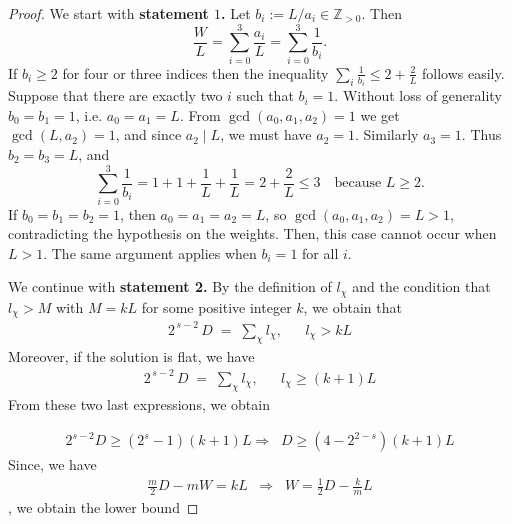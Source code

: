 \documentclass[12pt,twoside,]{amsart}
\theoremstyle{plain}
\theoremstyle{definition}
\begin{document}
\begin{proof}
We start with \textbf{statement $1$.} Let  $b_i:=L/a_i \in\mathbb{Z}_{>0}$. Then
\[
\frac{W}{L}=\sum_{i=0}^3\frac{a_i}{L}=\sum_{i=0}^3\frac{1}{b_i}.
\]
 If $b_i \geq 2$ for four or three indices then the inequality $\sum_i \frac{1}{b_i}\le 2+\frac{2}{L}$ follows easily. Suppose that there are exactly two $i$ such that $b_i =1$.  Without loss of generality $b_0=b_1=1$, i.e. $a_0=a_1=L$.
From $\gcd(a_0,a_1,a_2)=1$ we get $\gcd(L,a_2)=1$, and since $a_2\mid L$, we must have $a_2=1$. Similarly $a_3=1$. Thus $b_2=b_3=L$, and
\[
\sum_{i=0}^3 \frac{1}{b_i}=1+1+\frac{1}{L}+\frac{1}{L}=2+\frac{2}{L}\le 3
\quad\text{because }L\ge 2.
\]
If $b_0=b_1 =b_2=1$, then $a_0=a_1=a_2=L$, so $\gcd(a_0,a_1,a_2)=L>1$, contradicting the hypothesis on the weights. Then, this case cannot occur
when $L>1$. The same argument applies when  $b_i=1$ for all $i$.

We continue with \textbf{statement 2.}
By the definition of $l_\chi$ and the condition that $l_\chi > M$ with $M=kL$ for some positive integer $k$, we obtain that 
\begin{align*}
    2^{\,s-2}\,D \;=\; \sum_{\chi}l_\chi,
    &&
    l_\chi > kL
\end{align*}
Moreover, if the solution is flat, we have 
\begin{align}
    2^{\,s-2}\,D \;=\; \sum_{\chi}l_\chi,
    &&
    l_\chi \geq (k+1)L
\label{eq: divisor sum and line bundle sum}
\end{align}
From these two last expressions, we obtain

\begin{align}
  2^{s-2}D \geq (2^s-1)(k+1)L 
   \Longrightarrow\;\;
   D \geq (4-2^{2-s})(k+1)L
\label{eq:lower_bound_D flat}    
\end{align}
Since, we have
\begin{align}
 \frac{m}{2}D-mW  = kL     \;\;\Longrightarrow\;\;
 W =  \frac{1}{2}D - \frac{k}{m}L
\label{eq:W_D_M}
\end{align}
, we obtain the lower bound


\end{proof}
\end{document}
